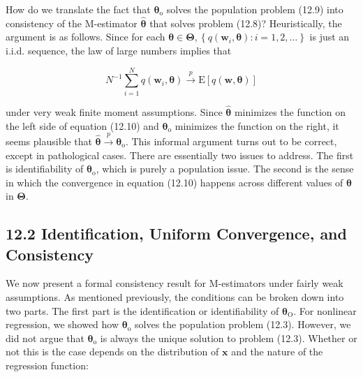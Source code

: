 \documentclass[10pt]{article}
\begin{document}
How do we translate the fact that $\boldsymbol{\theta}_{\mathrm{o}}$ solves the population problem (12.9) into consistency of the M-estimator $\hat{\boldsymbol{\theta}}$ that solves problem (12.8)? Heuristically, the argument is as follows. Since for each $\boldsymbol{\theta} \in \boldsymbol{\Theta},\left\{q\left(\mathbf{w}_{i}, \boldsymbol{\theta}\right): i=1,2, \ldots\right\}$ is just an i.i.d. sequence, the law of large numbers implies that


\begin{equation*}
N^{-1} \sum_{i=1}^{N} q\left(\mathbf{w}_{i}, \boldsymbol{\theta}\right) \xrightarrow{p} \mathrm{E}[q(\mathbf{w}, \boldsymbol{\theta})] \tag{12.10}
\end{equation*}


under very weak finite moment assumptions. Since $\hat{\boldsymbol{\theta}}$ minimizes the function on the left side of equation (12.10) and $\boldsymbol{\theta}_{\mathrm{o}}$ minimizes the function on the right, it seems plausible that $\hat{\boldsymbol{\theta}} \xrightarrow{p} \boldsymbol{\theta}_{\mathrm{o}}$. This informal argument turns out to be correct, except in pathological cases. There are essentially two issues to address. The first is identifiability of $\boldsymbol{\theta}_{\mathrm{o}}$, which is purely a population issue. The second is the sense in which the convergence in equation (12.10) happens across different values of $\boldsymbol{\theta}$ in $\boldsymbol{\Theta}$.

\subsection*{12.2 Identification, Uniform Convergence, and Consistency}
We now present a formal consistency result for M-estimators under fairly weak assumptions. As mentioned previously, the conditions can be broken down into two parts. The first part is the identification or identifiability of $\boldsymbol{\theta}_{\mathrm{O}}$. For nonlinear regression, we showed how $\boldsymbol{\theta}_{\mathrm{o}}$ solves the population problem (12.3). However, we did not argue that $\boldsymbol{\theta}_{\mathrm{o}}$ is always the unique solution to problem (12.3). Whether or not this is the case depends on the distribution of $\mathbf{x}$ and the nature of the regression function:
\end{document}
